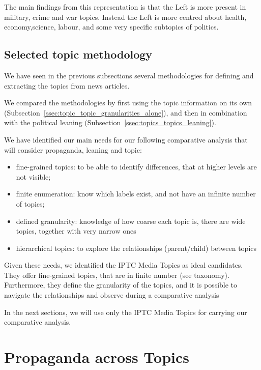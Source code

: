 The main findings from this representation is that the Left is more present in military, crime and war topics. Instead the Left is more centred about health, economy,science, labour, and some very specific subtopics of politics.


\subsection{\statusgreen Selected topic methodology}
\label{ssec:topic_topic_choice}

We have seen in the previous subsections several methodologies for defining and extracting the topics from news articles.

We compared the methodologies by first using the topic information on its own (Subsection~\ref{ssec:topic_topic_granularities_alone}), and then in combination with the political leaning (Subsection~\ref{ssec:topics_topics_leaning}).

We have identified our main needs for our following comparative analysis that will consider propaganda, leaning and topic:

\begin{itemize}
    \item fine-grained topics: to be able to identify differences, that at higher levels are not visible;
    \item finite enumeration: know which labels exist, and not have an infinite number of topics;
    \item defined granularity: knowledge of how coarse each topic is, there are wide topics, together with very narrow ones
    \item hierarchical topics: to explore the relationships (parent/child) between topics
\end{itemize}

Given these needs, we identified the IPTC Media Topics as ideal candidates.
They offer fine-grained topics, that are in finite number (see taxonomy). Furthermore, they define the granularity of the topics, and it is possible to navigate the relationships and observe during a comparative analysis 

In the next sections, we will use only the IPTC Media Topics for carrying our comparative analysis.


\section{\statusgreen Propaganda across Topics}
\label{sec:topic_propaganda}

